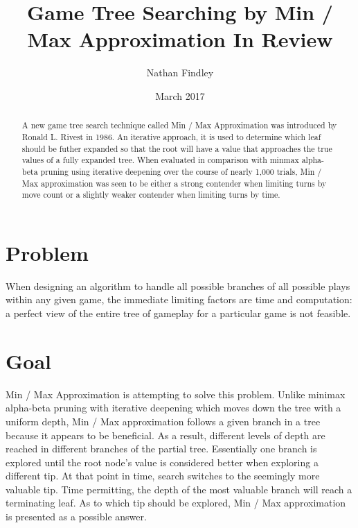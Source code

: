 \documentclass[10pt, a4paper]{article}
\title{Game Tree Searching by Min / Max Approximation In Review}
\author{Nathan Findley}
\date{March 2017}
\begin{document}
\maketitle

\begin{abstract}

A new game tree search technique called Min / Max Approximation was introduced
by Ronald L. Rivest in 1986.  An iterative approach, it is used to determine
which leaf should be futher expanded so that the root will have a value that
approaches the true values of a fully expanded tree.  When evaluated in 
comparison with minmax alpha-beta pruning
using iterative deepening over the course of nearly 1,000 trials, Min / Max
approximation was seen to be either a strong contender when limiting turns by move count 
or a slightly weaker contender when limiting turns by time.

\end{abstract}

\section{Problem} 

When designing an algorithm to handle all possible branches of all possible
plays within any given game, the immediate limiting factors are time and computation: a perfect
view of the entire tree of gameplay for a particular game is not feasible.

\section{Goal} 

Min / Max Approximation is attempting to solve this problem.  Unlike minimax
alpha-beta pruning with iterative deepening which moves down the tree with a uniform depth, 
Min / Max approximation follows a
given branch in a tree because it appears to be beneficial.  As a result, different
levels of depth are reached in different branches of the partial tree.  Essentially one branch is explored
until the root node's value is considered better when exploring a different tip.
At that point in time, search switches to the seemingly more valuable tip.  
Time permitting, the depth of the most valuable branch will reach a terminating leaf.  As to which tip should 
be explored, Min / Max approximation is presented as a possible answer.
\end{document}
